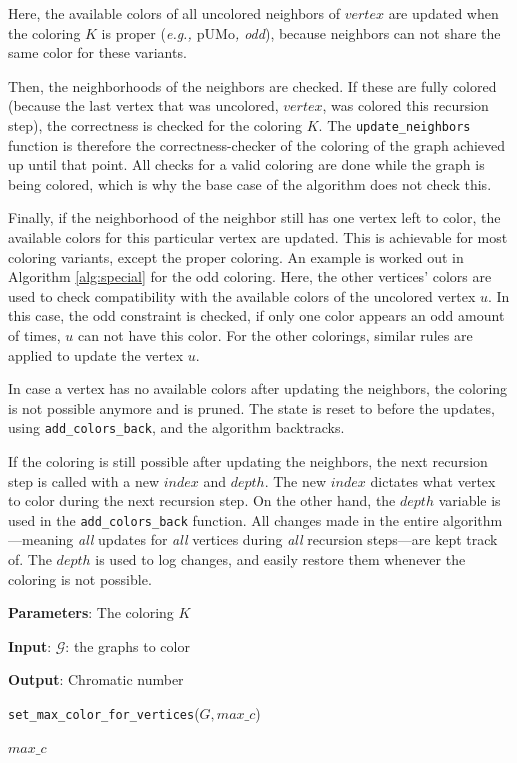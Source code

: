 \documentclass{article}
\begin{document}
Here, the available colors of all uncolored neighbors of $vertex$ are updated when the coloring $K$ is proper (\textit{e.g., $\mathrm{pUMo}$, odd}), because neighbors can not share the same color for these variants. 

Then, the neighborhoods of the neighbors are checked. If these are fully colored (because the last vertex that was uncolored, $vertex$, was colored this recursion step), the correctness is checked for the coloring $K$. 
The \texttt{update\_neighbors} function is therefore the correctness-checker of the coloring of the graph achieved up until that point. All checks for a valid coloring are done while the graph is being colored, which is why the base case of the algorithm does not check this.

Finally, if the neighborhood of the neighbor still has one vertex left to color, the available colors for this particular vertex are updated. This is achievable for most coloring variants, except the proper coloring. An example is worked out in Algorithm \ref{alg:special} for the odd coloring. Here, the other vertices' colors are used to check compatibility with the available colors of the uncolored vertex $u$. In this case, the odd constraint is checked, if only one color appears an odd amount of times, $u$ can not have this color.
For the other colorings, similar rules are applied to update the vertex $u$.

In case a vertex has no available colors after updating the neighbors, the coloring is not possible anymore and is pruned. The state is reset to before the updates, using \texttt{add\_colors\_back}, and the algorithm backtracks.


If the coloring is still possible after updating the neighbors, the next recursion step is called with a new $index$ and $depth$. 
The new $index$ dictates what vertex to color during the next recursion step. On the other hand, the $depth$ variable is used in the \texttt{add\_colors\_back} function. All changes made in the entire algorithm---meaning \textit{all} updates for \textit{all} vertices during \textit{all} recursion steps---are kept track of. The $depth$ is used to log changes, and easily restore them whenever the coloring is not possible.


\begin{algorithm}[tb]
	\caption{\texttt{search\_chromatic\_number}}
	\label{alg:search}
	\textbf{Parameters}: The coloring $K$
	
	\textbf{Input}: $\mathcal{G}$: the graphs to color
	
	\textbf{Output}: Chromatic number
	\begin{algorithmic}[1]
		\STATE \texttt{set\_max\_color\_for\_vertices}($G, max\_c$)
		
		\RETURN $max\_c$
		\ENDIF
		\ENDFOR
		\ENDFOR
	\end{algorithmic}
\end{algorithm}
\end{document}
